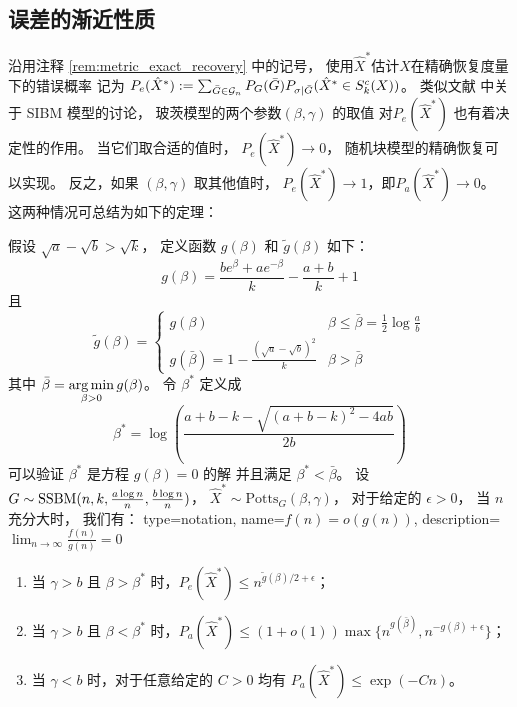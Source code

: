 \subsection{误差的渐近性质}
沿用注释 \ref{rem:metric_exact_recovery} 中的记号，
使用$\hat{X}^*$估计$X$在精确恢复度量下的错误概率
记为 $P_e(\hat{X}^*) := \sum_{\bar{G} \in \mathcal{G}_n}
P_G(\bar{G}) P_{\sigma | \bar{G}}(\hat{X}^* \in S^c_k(X))$。
类似文献  中关于 SIBM 模型的讨论，
玻茨模型的两个参数$(\beta, \gamma)$ 的取值
对$P_e(\hat{X}^*)$
也有着决定性的作用。
当它们取合适的值时， 
$ P_e(\hat{X}^*)\to 0$，
随机块模型的精确恢复可以实现。
反之，如果 $(\beta, \gamma)$ 取其他值时，
$P_e(\hat{X}^*) \to 1$，即$P_a(\hat{X}^*) \to 0$。
这两种情况可总结为如下的定理：

\begin{theorem}\label{thm:phase_transition}
	假设 $\sqrt{a} - \sqrt{b} > \sqrt{k}$，
	定义函数 $g(\beta)$ 和 $ \tilde{g}(\beta)$ 如下：
	\begin{equation}
		\label{eq:g_beta_main_article}
		g(\beta) = \frac{be^{\beta} + a e^{-\beta}}{k} - \frac{a+b}{k} +1
	\end{equation}
	且
	\begin{equation}
		\label{eq:g_tilde_beta_main_article}
	\tilde{g}(\beta) = \begin{cases}
	g(\beta) & \beta \leq \bar{\beta} = \frac{1}{2}\log \frac{a}{b} \\
	g(\bar{\beta}) = 1 - \frac{\left(\sqrt{a} - \sqrt{b}\right)^2}{k} & \beta > \bar{\beta}
	\end{cases}
	\end{equation}
	其中
	$\bar{\beta} =  \displaystyle\operatorname*{arg\,min}_{\beta > 0} g(\beta)$。
	令 $\beta^*$ 定义成
	\begin{equation}\label{eq:beta_star}
	\beta^* = \log\left(\frac{a + b - k - \sqrt{(a + b - k)^2 - 4 a b}}{2  b}\right)
	\end{equation}
	可以验证 $\beta^*$ 是方程 $g(\beta) = 0$ 的解 并且满足  $\beta^* < \bar{\beta}$。	
	设 $G\sim \operatorname{SSBM}(n, k, \frac{a \log n}{n}, \frac{b \log n}{n})$， $\hat{X}^* \sim \textrm{Potts}_G(\beta, \gamma)$，
	对于给定的 $\epsilon > 0$， 当 $n$ 充分大时， 我们有：
	{
	  type=notation,
	  name={$f(n)=o(g(n))$},
	  description={$\lim_{n\to\infty} \frac{f(n)}{g(n)}=0$}
	}
	\begin{enumerate}
	\item 当 $\gamma > b$ 且 $\beta > \beta^*$ 时，$P_e(\hat{X}^*) \leq n^{\tilde{g}(\beta)/2 + \epsilon}$；
	\item 当 $\gamma > b$ 且 $\beta < \beta^*$ 时，$P_a(\hat{X}^*) \leq (1+o(1))\max\{n^{g(\bar{\beta})}, n^{-g(\beta) + \epsilon}\}$；
	\item 当 $\gamma < b$ 时，对于任意给定的 $C>0$	均有 $P_a(\hat{X}^*) \leq \exp(-C n)$。
	\end{enumerate}
\end{theorem}

